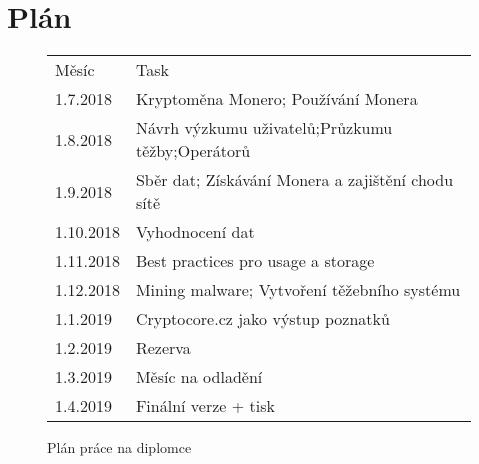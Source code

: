 \documentclass[
  printed, %
  table,   %
  nolof,     %
  nolot,     %
           oneside, color
]{fithesis3}
\begin{document}
\chapter{Plán}

\begin{figure}[H]
\center
\begin{tabular}{ll}
Měsíc     & Task                                              \\
1.7.2018  & Kryptoměna Monero; Používání Monera               \\
1.8.2018  & Návrh výzkumu uživatelů;Průzkumu těžby;Operátorů  \\
1.9.2018  & Sběr dat; Získávání Monera a zajištění chodu sítě \\
1.10.2018 & Vyhodnocení dat                                   \\
1.11.2018 & Best practices pro usage a storage                \\
1.12.2018 & Mining malware; Vytvoření těžebního systému       \\
1.1.2019  & Cryptocore.cz jako výstup poznatků                \\
1.2.2019  & Rezerva                                           \\
1.3.2019  & Měsíc na odladění                                 \\
1.4.2019  & Finální verze + tisk                             
\end{tabular}
\caption{Plán práce na diplomce}
\label{ssme-thesis-plan}
\end{figure}



\printbibliography[heading=bibintoc]

\appendix %
\end{document}
